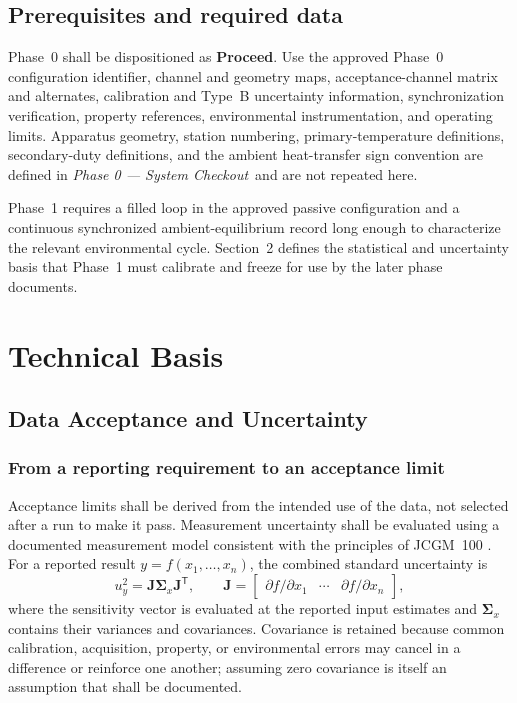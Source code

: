 \documentclass[11pt]{article}
\newcommand{\PhaseZeroDoc}{\textit{Phase 0 --- System Checkout}}
\begin{document}
\subsection{Prerequisites and required data}
Phase~0 shall be dispositioned as \textbf{Proceed}. Use the approved Phase~0 configuration identifier, channel and geometry maps, acceptance-channel matrix and alternates, calibration and Type~B uncertainty information, synchronization verification, property references, environmental instrumentation, and operating limits. Apparatus geometry, station numbering, primary-temperature definitions, secondary-duty definitions, and the ambient heat-transfer sign convention are defined in \PhaseZeroDoc~and are not repeated here.

Phase~1 requires a filled loop in the approved passive configuration and a continuous synchronized ambient-equilibrium record long enough to characterize the relevant environmental cycle. Section~2 defines the statistical and uncertainty basis that Phase~1 must calibrate and freeze for use by the later phase documents.

\clearpage
\section{Technical Basis}
\label{sec:technical_basis}
\subsection{Data Acceptance and Uncertainty}
\label{sec:uncertainty}

\subsubsection{From a reporting requirement to an acceptance limit}

Acceptance limits shall be derived from the intended use of the data, not selected after a run to make it pass. Measurement uncertainty shall be evaluated using a documented measurement model consistent with the principles of JCGM~100 \cite{jcgm100}. For a reported result $y=f(x_1,\ldots,x_n)$, the combined standard uncertainty is
\begin{equation}
    u_y^2
    =
    \mathbf J\boldsymbol\Sigma_x\mathbf J^{\mathsf T},
    \qquad
    \mathbf J
    =
    \begin{bmatrix}
        \partial f/\partial x_1 & \cdots & \partial f/\partial x_n
    \end{bmatrix},
    \label{eq:propagation_matrix}
\end{equation}
where the sensitivity vector is evaluated at the reported input estimates and $\boldsymbol\Sigma_x$ contains their variances and covariances. Covariance is retained because common calibration, acquisition, property, or environmental errors may cancel in a difference or reinforce one another; assuming zero covariance is itself an assumption that shall be documented.
\end{document}
